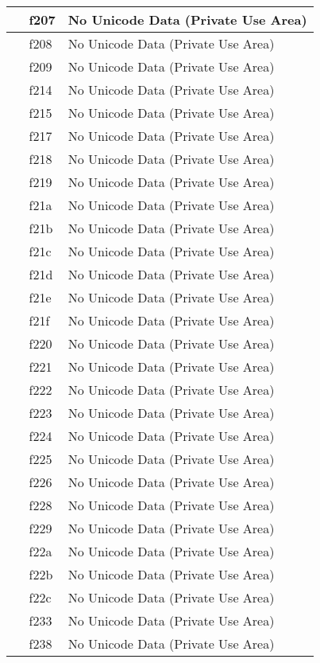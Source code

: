\documentclass[12pt,letterpaper,openany]{book}
\begin{document}
\begin{center}
\begin{supertabular}{|m{0.25in}|m{0.5in}|m{4in}|}
 & f207 & No Unicode Data (Private Use Area)\\\hline
 & f208 & No Unicode Data (Private Use Area)\\\hline
 & f209 & No Unicode Data (Private Use Area)\\\hline
 & f214 & No Unicode Data (Private Use Area)\\\hline
 & f215 & No Unicode Data (Private Use Area)\\\hline
 & f217 & No Unicode Data (Private Use Area)\\\hline
 & f218 & No Unicode Data (Private Use Area)\\\hline
 & f219 & No Unicode Data (Private Use Area)\\\hline
 & f21a & No Unicode Data (Private Use Area)\\\hline
 & f21b & No Unicode Data (Private Use Area)\\\hline
 & f21c & No Unicode Data (Private Use Area)\\\hline
 & f21d & No Unicode Data (Private Use Area)\\\hline
 & f21e & No Unicode Data (Private Use Area)\\\hline
 & f21f & No Unicode Data (Private Use Area)\\\hline
 & f220 & No Unicode Data (Private Use Area)\\\hline
 & f221 & No Unicode Data (Private Use Area)\\\hline
 & f222 & No Unicode Data (Private Use Area)\\\hline
 & f223 & No Unicode Data (Private Use Area)\\\hline
 & f224 & No Unicode Data (Private Use Area)\\\hline
 & f225 & No Unicode Data (Private Use Area)\\\hline
 & f226 & No Unicode Data (Private Use Area)\\\hline
 & f228 & No Unicode Data (Private Use Area)\\\hline
 & f229 & No Unicode Data (Private Use Area)\\\hline
 & f22a & No Unicode Data (Private Use Area)\\\hline
 & f22b & No Unicode Data (Private Use Area)\\\hline
 & f22c & No Unicode Data (Private Use Area)\\\hline
 & f233 & No Unicode Data (Private Use Area)\\\hline
 & f238 & No Unicode Data (Private Use Area)\\\hline

\end{supertabular}
\end{center}
\end{document}
